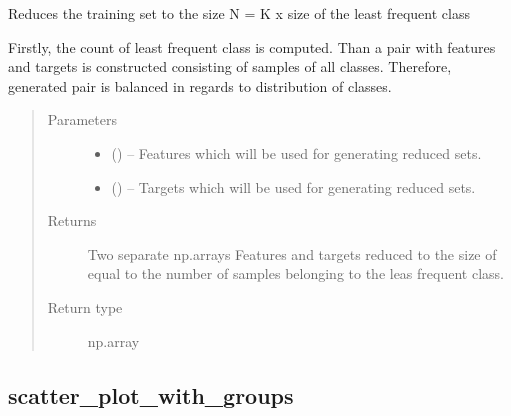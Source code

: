\documentclass[letterpaper,10pt,english]{sphinxmanual}
\begin{document}
\begin{fulllineitems}
\label{\detokenize{api/ucf.reduce_set_to_equal_distribution_of_classes:ucf.reduce_set_to_equal_distribution_of_classes}}
Reduces the training set to the size N = K x size of the
least frequent class

Firstly, the count of least frequent class is computed. Than a pair
with features and targets is constructed consisting of samples of
all classes. Therefore, generated pair is balanced in regards to
distribution of classes.
\begin{quote}\begin{description}
\item[{Parameters}] \leavevmode\begin{itemize}
\item {} 
 () -- Features which will be used for generating reduced sets.

\item {} 
 () -- Targets which will be used for generating reduced sets.

\end{itemize}

\item[{Returns}] \leavevmode
Two separate np.arrays Features and targets reduced to the size of
equal to the number of samples belonging to the leas frequent class.

\item[{Return type}] \leavevmode
np.array

\end{description}\end{quote}

\end{fulllineitems}



\subsection{scatter\_plot\_with\_groups}
\label{\detokenize{api/ucf.scatter_plot_with_groups:scatter-plot-with-groups}}\label{\detokenize{api/ucf.scatter_plot_with_groups::doc}}
\end{document}
